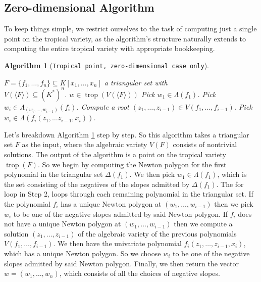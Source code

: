 \documentclass[11pt,reqno,a4paper]{article}
\theoremstyle{theoremstyle}
\theoremstyle{examplestyle}
\theoremstyle{algorithmstyle}
\newtheorem{algorithm}[theorem]{Algorithm}
\numberwithin{equation}{subsection}
\DeclareMathOperator{\trop}{trop}
\begin{document}
\subsection{Zero-dimensional Algorithm}
To keep things simple, we restrict ourselves to the task of computing just a single point on the tropical variety, as the algorithm's structure naturally extends to computing the entire tropical variety with appropriate bookkeeping.



\begin{algorithm}[\texttt{Tropical point, zero-dimensional case only}]\
  \begin{algorithmic}[1]
  \REQUIRE $F = \{f_1, \ldots,f_n\} \subseteq K[x_1,\ldots,x_n]$ a triangular set with \\\hspace{20pt}$V(\langle F \rangle) \subseteq (K^*)^n$.
  \ENSURE $w\in \trop\left(V(\langle F\rangle)\right)$
  \STATE Pick $w_1 \in \Lambda(f_1)$.
      \STATE Pick $w_i \in \Lambda_{(w_i,\ldots,w_{i-1})}(f_i)$.
    \ELSE
      \STATE Compute a root $(z_1,\ldots,z_{i-1}) \in V(f_1,\ldots,f_{i-1})$.
      \STATE Pick $w_i \in \Lambda(f_i(z_1,\ldots z_{i-1},x_i))$.
    \ENDIF
  \ENDFOR
  \end{algorithmic}
  \label{alg:0Tropicalpoint}
\end{algorithm}

Let's breakdown Algorithm \ref{alg:0Tropicalpoint} step by step. So this algorithm takes a triangular set $F$ as the input, where the algebraic variety $V(F)$ consists of nontrivial solutions. The output of the algorithm is a point on the tropical variety $\trop(F)$. So we begin by computing the Newton polygon for the first polynomial in the triangular set $\Delta(f_1)$. We then pick $w_1 \in \Lambda(f_1)$, which is the set consisting of the negatives of the slopes admitted by $\Delta(f_1)$. The for loop in Step 2, loops through each remaining polynomial in the triangular set. If the polynomial $f_i$ has a unique Newton polygon at $(w_1,\ldots,w_{i-1})$ then we pick $w_i$ to be one of the negative slopes admitted by said Newton polygon. If $f_i$ does not have a unique Newton polygon at $(w_1,\ldots,w_{i-1})$ then we compute a solution $(z_1,\ldots,z_{i-1})$ of the algebraic variety of the previous polynomials $V(f_1,\ldots,f_{i-1})$. We then have the univariate polynomial $f_i(z_1,\ldots,z_{i-1},x_i)$, which has a unique Newton polygon. So we choose $w_i$ to be one of the negative slopes admitted by said Newton polygon. Finally, we then return the vector $w = (w_1,\ldots , w_n)$, which consists of all the choices of negative slopes.
\end{document}
